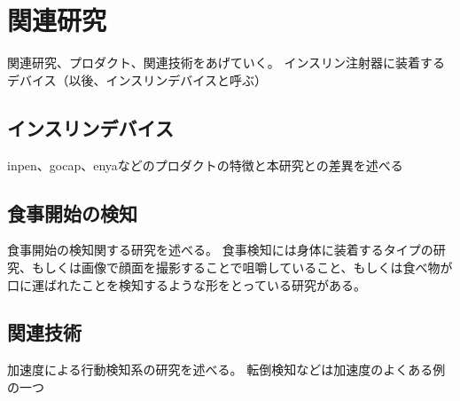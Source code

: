 \chapter{関連研究}
\label{chap:related_works}

関連研究、プロダクト、関連技術をあげていく。
インスリン注射器に装着するデバイス（以後、インスリンデバイスと呼ぶ）

\section{インスリンデバイス}

inpen、gocap、enyaなどのプロダクトの特徴と本研究との差異を述べる

\section{食事開始の検知}

食事開始の検知関する研究を述べる。
食事検知には身体に装着するタイプの研究、もしくは画像で顔面を撮影することで咀嚼していること、もしくは食べ物が口に運ばれたことを検知するような形をとっている研究がある。

\section{関連技術}

加速度による行動検知系の研究を述べる。
転倒検知などは加速度のよくある例の一つ
